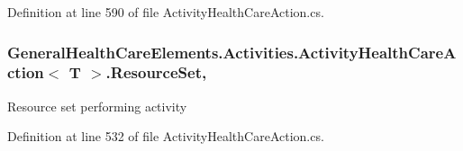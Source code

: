 Definition at line 590 of file Activity\+Health\+Care\+Action.\+cs.

\subsubsection[{\texorpdfstring{Resource\+Set}{ResourceSet}}]{ {\bf General\+Health\+Care\+Elements.\+Activities.\+Activity\+Health\+Care\+Action}$<$ T $>$.{\bf Resource\+Set}\hspace{0.3cm}{\ttfamily [get]}, {\ttfamily [set]}}\hypertarget{class_general_health_care_elements_1_1_activities_1_1_activity_health_care_action_a46a1229f0760fce3bbb06b804fc2508a}{}\label{class_general_health_care_elements_1_1_activities_1_1_activity_health_care_action_a46a1229f0760fce3bbb06b804fc2508a}


Resource set performing activity 



Definition at line 532 of file Activity\+Health\+Care\+Action.\+cs.

